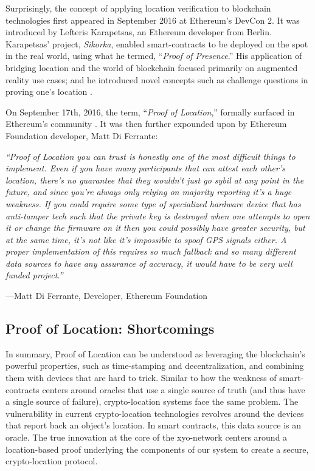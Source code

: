 \documentclass{article}
\begin{document}
Surprisingly, the concept of applying location verification to blockchain technologies first appeared in September 2016 at Ethereum's DevCon 2. It was introduced by Lefteris Karapetsas, an Ethereum developer from Berlin. Karapetsas' project, \textit{Sikorka}, enabled \glspl{smart-contract} to be deployed on the spot in the real world, using what he termed, ``\textit{Proof of Presence}.'' His application of bridging location and the world of blockchain focused primarily on augmented reality use cases; and he introduced novel concepts such as challenge questions in proving one's location \cite{karapetsas-sikorka}.

On September 17th, 2016, the term, ``\textit{Proof of Location},'' formally surfaced in Ethereum's community \cite{diferrante-proofoflocation}. It was then further expounded upon by Ethereum Foundation developer, Matt Di Ferrante:

\begin{displayquote}\textit{``Proof of Location you can trust is honestly one of the most difficult things to implement. Even if you have many participants that can attest each other's location, there's no guarantee that they wouldn't just go sybil at any point in the future, and since you're always only relying on majority reporting it's a huge weakness.
If you could require some type of specialized hardware device that has anti-tamper tech such that the private key is destroyed when one attempts to open it or change the firmware on it then you could possibly have greater security, but at the same time, it's not like it's impossible to spoof GPS signals either.
A proper implementation of this requires so much fallback and so many different data sources to have any assurance of accuracy, it would have to be very well funded project.''} \cite{diferrante-proofoflocation}

\vspace{2mm}
---Matt Di Ferrante, Developer, Ethereum Foundation
\end{displayquote}


\subsection {Proof of Location: Shortcomings}

In summary, Proof of Location can be understood as leveraging the blockchain's powerful properties, such as time-stamping and decentralization, and combining them with devices that are hard to trick. Similar to how the weakness of \glspl{smart-contract} centers around oracles that use a single source of truth (and thus have a single source of failure), crypto-location systems face the same problem. The vulnerability in current crypto-location technologies revolves around the devices that report back an object's location. In smart contracts, this data source is an oracle. The true innovation at the core of the \Gls{xyo-network} centers around a location-based proof underlying the components of our system to create a secure, crypto-location protocol.
\end{document}

